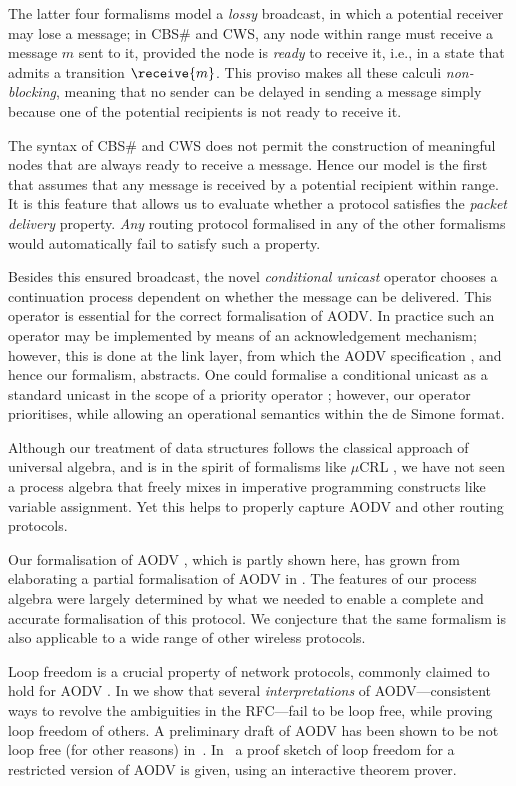\documentclass[envcountsame,envcountsect,orivec,runningheads]{llncs}
\begin{document}
The latter four formalisms model a \emph{lossy} broadcast, in which a
potential receiver may lose a message; in CBS\# and CWS, any node
within range must receive a message $m$ sent to it, provided the node
is \emph{ready} to receive it, i.e., in a state that admits a
transition $\receive{m}$. This proviso makes all these calculi
\emph{non-blocking}, meaning that no sender can be delayed in
sending a message simply because one of the potential recipients
is not ready to receive it.

The syntax of CBS\# and CWS does not permit the construction of
meaningful nodes that are always ready to receive a message.  Hence
our model is the first that assumes that any message is received by a
potential recipient within range.  It is this feature that allows us
to evaluate whether a protocol satisfies the \emph{packet delivery}
property.  \emph{Any} routing protocol formalised in any of the other
formalisms would automatically fail to satisfy such a property.

Besides this ensured broadcast, the novel \emph{conditional unicast}
operator chooses a continuation process dependent on whether the
message can be delivered.  This operator is essential for the correct
formalisation of AODV\@.  In practice such an operator may be
implemented by means of an acknowledgement mechanism; however, this is
done at the link layer, from which the AODV specification
\cite{rfc3561}, and hence our formalism, abstracts. 
One could
formalise a conditional unicast as a standard unicast in the
scope of a priority operator \cite{CLN01}; however, our operator
prioritises, while allowing an operational semantics within the
de Simone format.


Although our treatment of data structures follows the classical
approach of universal algebra, and is in the spirit of formalisms like
$\mu$CRL \cite{GP95}, we have not seen a process algebra that freely
mixes in imperative programming constructs like variable assignment.
Yet this helps to properly capture AODV and other routing protocols.

Our formalisation of AODV \cite{TR11}, which is partly
shown here, has grown from elaborating a partial formalisation
of AODV in \cite{SRS10}. 
The features of our process algebra were
largely determined by what we needed to enable a complete and accurate
formalisation of this protocol. We conjecture that the same formalism
is also applicable to a wide range of other wireless protocols.

Loop freedom is a crucial property of network protocols,
  commonly claimed to hold for AODV \cite{rfc3561}. In \cite{TR11}
  we show that several \emph{interpretations} of AODV---consistent
  ways to revolve the ambiguities in the RFC---fail to be loop free,
  while proving loop freedom of others.
 A preliminary draft of AODV has been shown to be not loop free
(for other reasons) in~\cite{BOG02}.
 In~\cite{ZYZW09} a proof sketch of loop freedom for a restricted
 version of AODV is given, using an interactive theorem prover.
\end{document}
